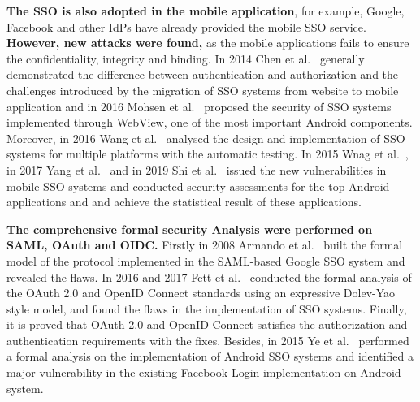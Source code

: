 
\textbf{The SSO is also adopted in the mobile application}, for example, Google, Facebook and other IdPs have already provided the mobile SSO service. \textbf{However, new attacks were found,} as the mobile applications fails to ensure the confidentiality, integrity and binding. In 2014 Chen et al.~\cite{ChenPCTKT14} generally demonstrated the difference between authentication and authorization and the challenges introduced by the migration of SSO systems from website to mobile application and in 2016 Mohsen et al.~\cite{MohsenS16} proposed the security of SSO systems implemented through WebView, one of the most important Android components.
 Moreover, in 2016 Wang et al.~\cite{WangZLG16} analysed the design and implementation of SSO systems for multiple platforms with the automatic testing. In 2015 Wnag et al.~\cite{WangZLLYLG15}, in 2017 Yang et al.~\cite{YangLS17} and in 2019 Shi et al.~\cite{ShiWL19} issued the new vulnerabilities in mobile SSO systems and conducted security assessments for the top Android applications and and achieve the statistical result of these applications.




\textbf{The comprehensive formal security Analysis were performed on SAML, OAuth and OIDC.} Firstly in 2008 Armando et al.~\cite{ArmandoCCCT08} built the formal model of the protocol implemented in the SAML-based Google SSO system and revealed the flaws. In 2016 and 2017 Fett et al.~\cite{FettKS16, FettKS17} conducted the formal analysis of the OAuth 2.0 and OpenID Connect standards using an expressive Dolev-Yao style model, and found the flaws in the implementation of SSO systems. Finally, it is proved that OAuth 2.0 and OpenID Connect satisfies the authorization and authentication requirements with the fixes. Besides, in 2015 Ye et al.~\cite{YeBWD15} performed a formal analysis on the implementation of Android SSO systems and identified a major vulnerability in the existing Facebook Login implementation on Android system.



